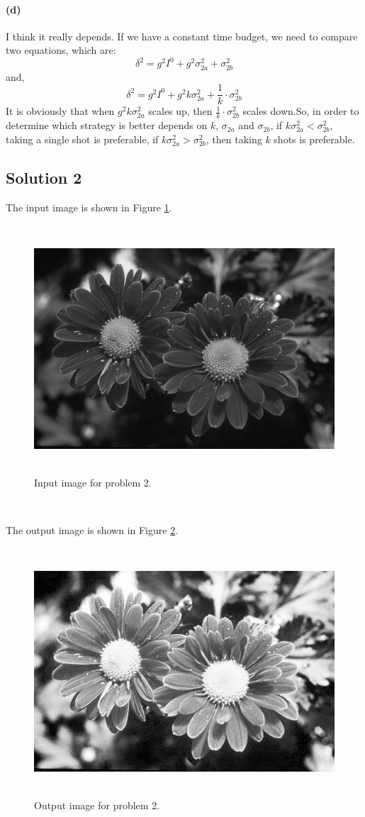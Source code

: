 \documentclass{article}
\newcommand{\solution}[1]{\clearpage \subsection*{Solution #1}}
\newcommand{\spart}[1]{\paragraph{(#1)}}
\begin{document}
\spart{d}I think it really depends. If we have a constant time budget, we need to compare two equations, which are:
$$
\delta^2 = g^2I^0 + g^2\sigma^2_{2a} + \sigma^2_{2b}
$$
and,
$$
\delta^2 = g^2I^0 + g^2k\sigma^2_{2a} + \frac{1}{k}\cdot\sigma^2_{2b}
$$
It is obviously that when $g^2k\sigma^2_{2a}$ scales up, then $\frac{1}{k}\cdot\sigma^2_{2b}$ scales down.So, in order to determine which strategy is better depends on $k$, $\sigma_{2a}$ and $\sigma_{2b}$, if $k\sigma^2_{2a} < \sigma^2_{2b}$, taking a single shot is preferable, if $k\sigma^2_{2a} > \sigma^2_{2b}$, then taking $k$ shots is preferable.

\solution{2}
The input image is shown in Figure \ref{fig:input}.
\begin{figure}[!h]
  \centering
    \includegraphics[height=25em]{code/inputs/p2_inp.jpg}
  \caption{Input image for problem 2.}
  \label{fig:input}
\end{figure}
\

The output image is shown in Figure \ref{fig:output}.
\begin{figure}[!h]
  \centering
    \includegraphics[height=25em]{code/outputs/prob2.jpg}
  \caption{Output image for problem 2.}
  \label{fig:output}
\end{figure}
\end{document}
